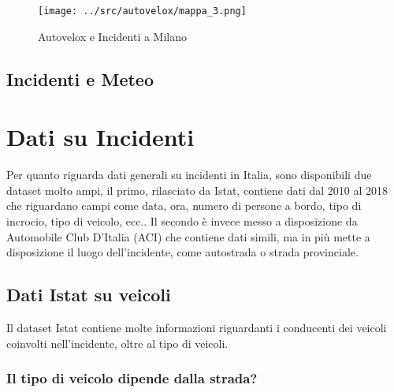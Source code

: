 \documentclass[a4paper]{report}
\begin{document}
\begin{figure}
    \texttt{[image: ../src/autovelox/mappa\_3.png]}
    \caption{Autovelox e Incidenti a Milano}
    \label{fig:autovelox}
\end{figure}




\section{Incidenti e Meteo}

\chapter{Dati su Incidenti}

Per quanto riguarda dati generali su incidenti in Italia, sono disponibili due dataset molto ampi, 
il primo, rilasciato da Istat, contiene dati dal 2010 al 2018 che riguardano campi come data, ora, 
numero di persone a bordo, tipo di incrocio, tipo di veicolo, ecc..
Il secondo è invece messo a disposizione da Automobile Club D'Italia (ACI) che contiene dati simili, 
ma in più mette a disposizione il luogo dell'incidente, come autostrada o strada provinciale.

\section{Dati Istat su veicoli}

Il dataset Istat contiene molte informazioni riguardanti i conducenti dei veicoli coinvolti 
nell'incidente, oltre al tipo di veicoli.

\subsection{Il tipo di veicolo dipende dalla strada?}
\end{document}
